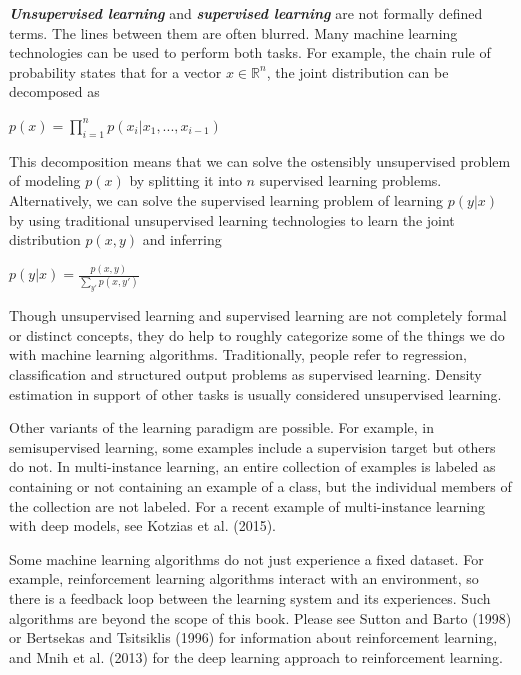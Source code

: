 \documentclass{report}
\begin{document}
\textbf{\textit{Unsupervised learning}} and \textbf{\textit{supervised learning}} are not formally defined terms. The lines between them are often blurred. Many machine learning technologies can be used to perform both tasks. For example, the chain rule of probability states that for a vector $x \in \mathbb{R}^n$, the joint distribution can be decomposed as\newline\newline
\centerline{$p(x) = \prod_{i=1}^{n} p(x_i | x_1, ..., x_{i-1})$}\newline\newline

This decomposition means that we can solve the ostensibly unsupervised problem of modeling $p(x)$ by splitting it into $n$ supervised learning problems. Alternatively, we can solve the supervised learning problem of learning $p(y|x)$ by using traditional unsupervised learning technologies to learn the joint distribution $p(x,y)$ and inferring\newline\newline
\centerline{$p(y|x)=\frac{p(x,y)}{\sum_{y'}p(x,y')}$}\newline

\noindent Though unsupervised learning and supervised learning are not completely formal or distinct concepts, they do help to roughly categorize some of the things we do with machine learning algorithms. Traditionally, people refer to regression, classification and structured output problems as supervised learning. Density estimation in support of other tasks is usually considered unsupervised learning.\newline

\noindent Other variants of the learning paradigm are possible. For example, in semisupervised learning, some examples include a supervision target but others do not. In multi-instance learning, an entire collection of examples is labeled as containing or not containing an example of a class, but the individual members of the collection are not labeled. For a recent example of multi-instance learning with deep models, see Kotzias et al. (2015).\newline

\noindent Some machine learning algorithms do not just experience a fixed dataset. For example, reinforcement learning algorithms interact with an environment, so there is a feedback loop between the learning system and its experiences. Such algorithms are beyond the scope of this book. Please see Sutton and Barto (1998) or Bertsekas and Tsitsiklis (1996) for information about reinforcement learning, and Mnih et al. (2013) for the deep learning approach to reinforcement learning.\newline
\end{document}
